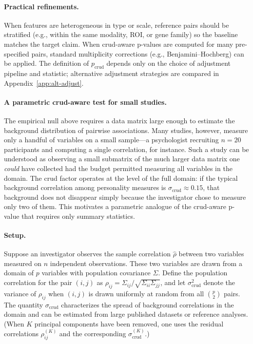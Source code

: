 \paragraph{Practical refinements.}
When features are heterogeneous in type or scale, reference pairs should be stratified (e.g., within the same modality, ROI, or gene family) so the baseline matches the target claim. When crud-aware p-values are computed for many pre-specified pairs, standard multiplicity corrections (e.g., Benjamini--Hochberg) can be applied. The definition of $p_{\mathrm{crud}}$ depends only on the choice of adjustment pipeline and statistic; alternative adjustment strategies are compared in Appendix~\ref{app:alt-adjust}.

\paragraph{A parametric crud-aware test for small studies.}
The empirical null above requires a data matrix large enough to estimate the background distribution of pairwise associations.
Many studies, however, measure only a handful of variables on a small sample---a psychologist recruiting $n=20$ participants and computing a single correlation, for instance.
Such a study can be understood as observing a small submatrix of the much larger data matrix one \emph{could} have collected had the budget permitted measuring all variables in the domain.
The crud factor operates at the level of the full domain: if the typical background correlation among personality measures is $\sigma_{\mathrm{crud}}\approx 0.15$, that background does not disappear simply because the investigator chose to measure only two of them.
This motivates a parametric analogue of the crud-aware p-value that requires only summary statistics.

\paragraph{Setup.}
Suppose an investigator observes the sample correlation $\hat\rho$ between two variables measured on $n$ independent observations.
These two variables are drawn from a domain of $p$ variables with population covariance $\Sigma$.
Define the population correlation for the pair $(i,j)$ as $\rho_{ij}=\Sigma_{ij}/\sqrt{\Sigma_{ii}\Sigma_{jj}}$, and let $\sigma_{\mathrm{crud}}^2$ denote the variance of $\rho_{ij}$ when $(i,j)$ is drawn uniformly at random from all $\binom{p}{2}$ pairs.
The quantity $\sigma_{\mathrm{crud}}$ characterizes the spread of background correlations in the domain and can be estimated from large published datasets or reference analyses.
(When $K$ principal components have been removed, one uses the residual correlations $\rho^{(K)}_{ij}$ and the corresponding $\sigma_{\mathrm{crud}}^{(K)}$.)

